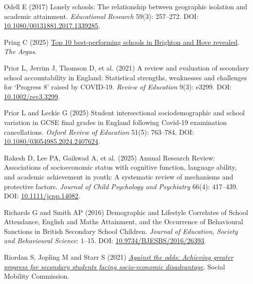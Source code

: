 \documentclass[
  11pt,
]{article}
\newlength{\cslhangindent}
\newenvironment{CSLReferences}[2] %
 {\begin{list}{}{%
  \setlength{\itemindent}{0pt}
  \setlength{\leftmargin}{0pt}
  \setlength{\parsep}{0pt}
  \ifodd #1
   \setlength{\leftmargin}{\cslhangindent}
   \setlength{\itemindent}{-1\cslhangindent}
  \fi
  \setlength{\itemsep}{#2\baselineskip}}}
 {\end{list}}
\begin{document}
\begin{CSLReferences}{1}{1}
Odell E (2017) Lonely schools: The relationship between geographic
isolation and academic attainment. \emph{Educational Research} 59(3):
257--272. DOI:
\href{https://doi.org/10.1080/00131881.2017.1339285}{10.1080/00131881.2017.1339285}.

Pring C (2025)
\href{https://www.theargus.co.uk/news/25560982.brighton-hoves-10-best-schools-gcse-results/}{Top
10 best-performing schools in {Brighton} and {Hove} revealed}. \emph{The
Argus}.

Prior L, Jerrim J, Thomson D, et al. (2021) A review and evaluation of
secondary school accountability in {England}: {Statistical} strengths,
weaknesses and challenges for {`{Progress} 8'} raised by {COVID}-19.
\emph{Review of Education} 9(3): e3299. DOI:
\href{https://doi.org/10.1002/rev3.3299}{10.1002/rev3.3299}.

Prior L and Leckie G (2025) Student intersectional sociodemographic and
school variation in {GCSE} final grades in {England} following
{Covid}-19 examination cancellations. \emph{Oxford Review of Education}
51(5): 763--784. DOI:
\href{https://doi.org/10.1080/03054985.2024.2407624}{10.1080/03054985.2024.2407624}.

Rakesh D, Lee PA, Gaikwad A, et al. (2025) Annual {Research} {Review}:
{Associations} of socioeconomic status with cognitive function, language
ability, and academic achievement in youth: A systematic review of
mechanisms and protective factors. \emph{Journal of Child Psychology and
Psychiatry} 66(4): 417--439. DOI:
\href{https://doi.org/10.1111/jcpp.14082}{10.1111/jcpp.14082}.

Richards G and Smith AP (2016) Demographic and {Lifestyle} {Correlates}
of {School} {Attendance}, {English} and {Maths} {Attainment}, and the
{Occurrence} of {Behavioural} {Sanctions} in {British} {Secondary}
{School} {Children}. \emph{Journal of Education, Society and Behavioural
Science}: 1--15. DOI:
\href{https://doi.org/10.9734/BJESBS/2016/26393}{10.9734/BJESBS/2016/26393}.

Riordan S, Jopling M and Starr S (2021)
\emph{\href{https://www.gov.uk/government/publications/against-the-odds}{Against
the odds: Achieving greater progress for secondary students facing
socio-economic disadvantage}}. Social Mobility Commission.


\end{CSLReferences}
\end{document}

